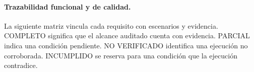 \paragraph{Trazabilidad funcional y de calidad.}
La siguiente matriz vincula cada requisito con escenarios y evidencia. COMPLETO significa que el alcance auditado cuenta con evidencia. PARCIAL indica una condición pendiente. NO VERIFICADO identifica una ejecución no corroborada. INCUMPLIDO se reserva para una condición que la ejecución contradice.


